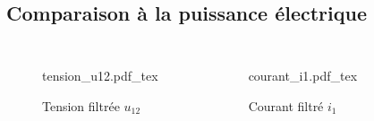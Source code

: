 \documentclass{style/presentation}
\begin{document}
\subsection{Comparaison à la puissance électrique}

\begin{frame}

    \begin{columns}[c]
        \begin{figure}
            \centering
            {\fontsize{6pt}{5pt}\selectfont
                \def\svgwidth{\textwidth}
                {tension_u12.pdf_tex}}
            \caption{Tension filtrée $u_{12}$}
        \end{figure}

        \begin{figure}
            \centering
            {\fontsize{6pt}{5pt}\selectfont
                \def\svgwidth{\textwidth}
                {courant_i1.pdf_tex}}
            \caption{Courant filtré $i_1$}
        \end{figure}
    \end{columns}
\end{frame}
\end{document}
